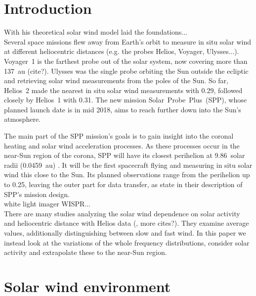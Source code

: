\section{Introduction}

With his theoretical solar wind model \citet{Parker1958} laid the foundations...\\

Several space missions flew away from Earth's orbit to measure in situ solar wind at different heliocentric distances (e.g. the probes Helios, Voyager, Ulysses...). Voyager~1 is the farthest probe out of the solar system, now covering more than 137~au (cite?). Ulysses was the single probe orbiting the Sun outside the ecliptic and retrieving solar wind measurements from the poles of the Sun. So far, Helios~2 made the nearest in situ solar wind measurements with \SI{0.29}{\au}, followed closely by Helios~1 with \SI{0.31}{\au}. The new mission Solar~Probe~Plus~(SPP), whose planned launch date is in mid 2018, aims to reach further down into the Sun's atmosphere.

The main part of the SPP mission's goals is to gain insight into the coronal heating and solar wind acceleration processes. As these processes occur in the near-Sun region of the corona, SPP will have its closest perihelion at 9.86~solar radii (0.0459~au) \citep{Fox2015}. It will be the first spacecraft flying and measuring in situ solar wind this close to the Sun. Its planned observations range from the perihelion up to \SI{0.25}{\au}, leaving the outer part for data transfer, as \citet{Fox2015} state in their description of SPP's mission design.\\

white light imager WISPR... \citep{Vourlidas2016}\\

There are many studies analyzing the solar wind dependence on solar activity and heliocentric distance with Helios data (\citet{Schwenn1983, Bougeret1984, Schwenn1990}, more cites?). They examine average values, additionally distinguishing between slow and fast wind. In this paper we instead look at the variations of the whole frequency distributions, consider solar activity and extrapolate these to the near-Sun region.\\


\section{Solar wind environment}

